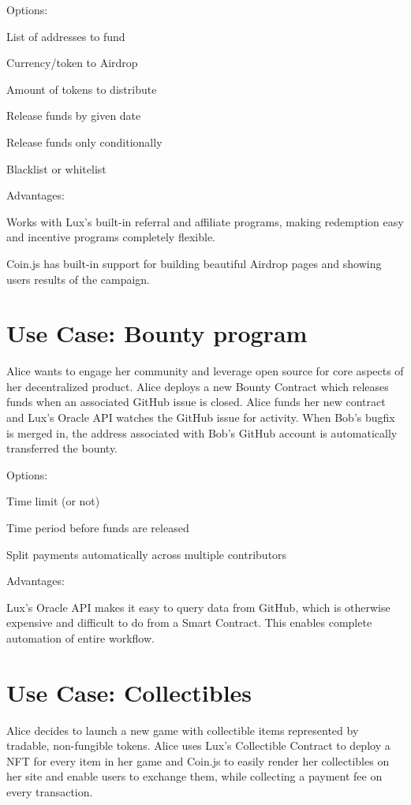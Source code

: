 \documentclass[11pt]{article}
\begin{document}
Options:


List of addresses to fund


Currency/token to Airdrop


Amount of tokens to distribute


Release funds by given date


Release funds only conditionally


Blacklist or whitelist


Advantages:


Works with Lux's built-in referral and affiliate programs, making redemption easy and incentive programs completely flexible.


Coin.js has built-in support for building beautiful Airdrop pages and showing users results of the campaign.


\section{Use Case: Bounty program}

Alice wants to engage her community and leverage open source for core aspects of her decentralized product. Alice deploys a new Bounty Contract which releases funds when an associated GitHub issue is closed. Alice funds her new contract and Lux's Oracle API watches the GitHub issue for activity. When Bob's bugfix is merged in, the address associated with Bob's GitHub account is automatically transferred the bounty.


Options:


Time limit (or not)


Time period before funds are released


Split payments automatically across multiple contributors


Advantages:


Lux's Oracle API makes it easy to query data from GitHub, which is otherwise expensive and difficult to do from a Smart Contract. This enables complete automation of entire workflow.


\section{Use Case: Collectibles}

Alice decides to launch a new game with collectible items represented by tradable, non-fungible tokens. Alice uses Lux's Collectible Contract to deploy a NFT for every item in her game and Coin.js to easily render her collectibles on her site and enable users to exchange them, while collecting a payment fee on every transaction.
\end{document}

